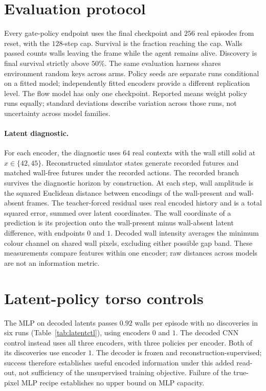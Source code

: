 \section{Evaluation protocol}
\label{app:protocol}

Every gate-policy endpoint uses the final checkpoint and $256$ real episodes from reset, with the
$128$-step cap. Survival is the fraction reaching the cap. Walls passed counts walls leaving the
frame while the agent remains alive. Discovery is final survival strictly above $50\%$.
The same evaluation harness shares environment random keys across arms. Policy seeds are separate
runs conditional on a fitted model; independently fitted encoders provide a different replication
level. The flow model has only one checkpoint. Reported means weight policy runs equally;
standard deviations describe variation across those runs, not uncertainty across model families.

\paragraph{Latent diagnostic.} For each encoder, the diagnostic uses $64$ real contexts with the
wall still solid at $x\in\{42,45\}$. Reconstructed simulator states generate recorded futures and
matched wall-free futures under the recorded actions. The recorded branch survives the diagnostic
horizon by construction. At each step, wall amplitude is the squared Euclidean distance between
encodings of the wall-present and wall-absent frames. The teacher-forced residual uses real encoded
history and is a total squared error, summed over latent coordinates.
The wall coordinate of a prediction is its projection onto the wall-present minus wall-absent
latent difference, with endpoints $0$ and $1$. Decoded wall intensity averages the minimum colour
channel on shared wall pixels, excluding either possible gap band. These measurements compare
features within one encoder; raw distances across models are not an information metric.

\section{Latent-policy torso controls}
\label{app:latentctl}

The MLP on decoded latents passes $0.92$ walls per episode with no discoveries in six runs
(Table~\ref{tab:latentctl}), using encoders $0$ and $1$. The decoded CNN control instead uses all
three encoders, with three policies per encoder. Both of its discoveries use encoder $1$.
The decoder is frozen and reconstruction-supervised; success therefore establishes useful encoded
information under this added read-out, not sufficiency of the unsupervised training objective.
Failure of the true-pixel MLP recipe establishes no upper bound on MLP capacity.

